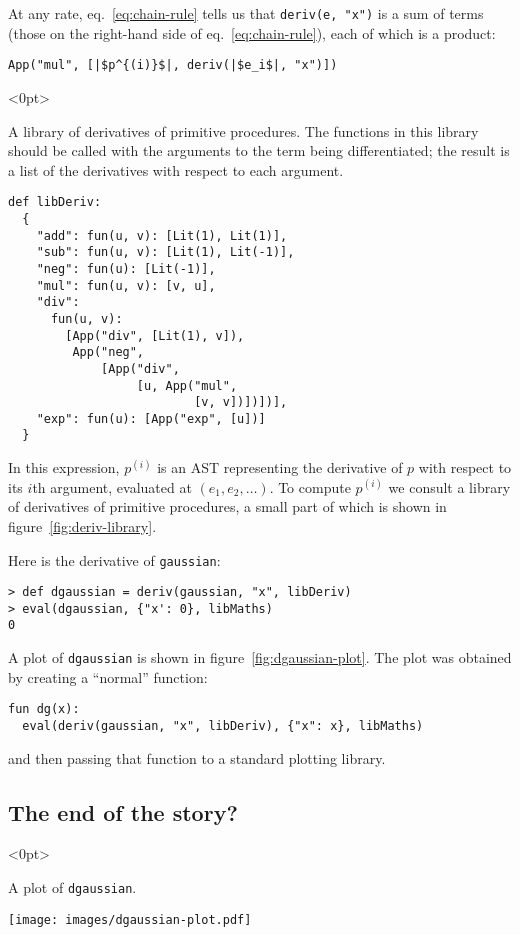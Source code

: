 \documentclass[11pt, a4paper]{article}
\newcommand{\cd}[1]{\texttt{#1}}
\begin{document}
At any rate, eq.~\ref{eq:chain-rule} tells us that \cd{deriv(e, "x")}
is a sum of terms (those on the right-hand side of
eq.~\eqref{eq:chain-rule}), each of which is a product:
\begin{verbatim}
App("mul", [|$p^{(i)}$|, deriv(|$e_i$|, "x")])
\end{verbatim}

\begin{marginfigure}<0pt>
  \caption{A library of derivatives of primitive
    procedures. The functions in this library should be called with
    the arguments to the term being differentiated; the result is a
    list of the derivatives with respect to each argument.\label{fig:deriv-library}}
  \footnotesize
\begin{verbatim}
def libDeriv:
  {
    "add": fun(u, v): [Lit(1), Lit(1)],
    "sub": fun(u, v): [Lit(1), Lit(-1)],
    "neg": fun(u): [Lit(-1)],
    "mul": fun(u, v): [v, u],
    "div": 
      fun(u, v):
        [App("div", [Lit(1), v]),
         App("neg",
             [App("div",
                  [u, App("mul",
                          [v, v])])])],
    "exp": fun(u): [App("exp", [u])]
  }
\end{verbatim}
\end{marginfigure}
In this expression, $p^{(i)}$ is an AST representing the derivative of
$p$ with respect to its $i$th argument, evaluated at
$(e_1, e_2, \dotsc)$. To compute $p^{(i)}$ we consult a library of
derivatives of primitive procedures, a small part of which is shown in
figure~\ref{fig:deriv-library}.

Here is the derivative of \cd{gaussian}:
\begin{verbatim}
> def dgaussian = deriv(gaussian, "x", libDeriv)
> eval(dgaussian, {"x': 0}, libMaths)
0
\end{verbatim}
A plot of \cd{dgaussian} is shown in figure~\ref{fig:dgaussian-plot}.
The plot was obtained by creating a ``normal'' function:
\begin{verbatim}
fun dg(x):
  eval(deriv(gaussian, "x", libDeriv), {"x": x}, libMaths)
\end{verbatim}
and then passing that function to a standard plotting library.

\subsection{The end of the story?}
\begin{marginfigure}<0pt>
  \caption{A plot of \cd{dgaussian}.\label{fig:dgaussian-plot}}
  \centering
  \texttt{[image: images/dgaussian-plot.pdf]}
\end{marginfigure}
  
\end{document}

